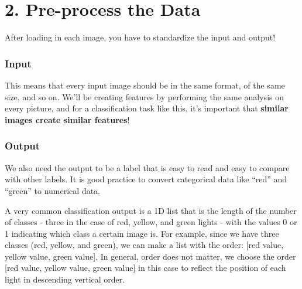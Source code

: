 \documentclass[11pt]{article}
\begin{document}
    \begin{center}
    \end{center}
    { \hspace*{\fill} \\}
    
    \begin{center}
    \end{center}
    { \hspace*{\fill} \\}
    
    \hypertarget{pre-process-the-data}{%
\section{2. Pre-process the Data}\label{pre-process-the-data}}

After loading in each image, you have to standardize the input and
output!

\hypertarget{input}{%
\subsubsection{Input}\label{input}}

This means that every input image should be in the same format, of the
same size, and so on. We'll be creating features by performing the same
analysis on every picture, and for a classification task like this, it's
important that \textbf{similar images create similar features}!

\hypertarget{output}{%
\subsubsection{Output}\label{output}}

We also need the output to be a label that is easy to read and easy to
compare with other labels. It is good practice to convert categorical
data like ``red'' and ``green'' to numerical data.

A very common classification output is a 1D list that is the length of
the number of classes - three in the case of red, yellow, and green
lights - with the values 0 or 1 indicating which class a certain image
is. For example, since we have three classes (red, yellow, and green),
we can make a list with the order: {[}red value, yellow value, green
value{]}. In general, order does not matter, we choose the order {[}red
value, yellow value, green value{]} in this case to reflect the position
of each light in descending vertical order.
\end{document}
